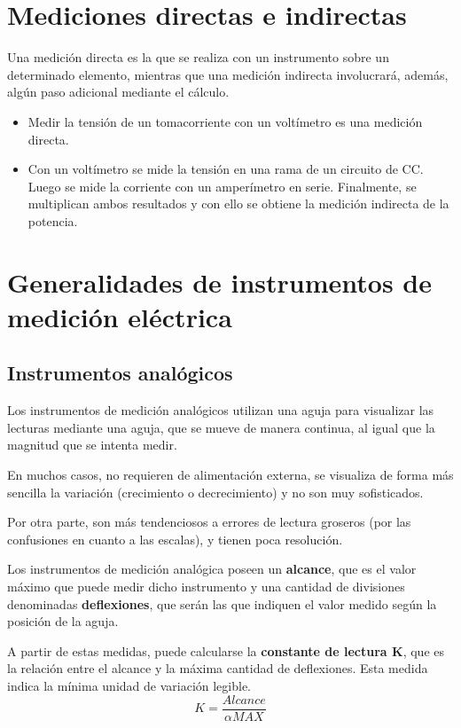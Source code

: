 \section{Mediciones directas e indirectas}

Una medición directa es la que se realiza con un instrumento sobre un determinado elemento, mientras que una medición indirecta involucrará, además, algún paso adicional mediante el cálculo.
\begin{ejemplo}
	
	\begin{itemize}
		\item Medir la tensión de un tomacorriente con un voltímetro es una medición directa.
		\item Con un voltímetro se mide la tensión en una rama de un circuito de CC. Luego se mide la corriente con un amperímetro en serie. Finalmente, se multiplican ambos resultados y con ello se obtiene la medición indirecta de la potencia.
	\end{itemize}		
\section{Generalidades de instrumentos de medición eléctrica}

\subsection{Instrumentos analógicos}

Los instrumentos de medición analógicos utilizan una aguja para visualizar las lecturas mediante una aguja, que se mueve de manera continua, al igual que la magnitud que se intenta medir.

En muchos casos, no requieren de alimentación externa, se visualiza de forma más sencilla la variación (crecimiento o decrecimiento) y no son muy sofisticados. 

Por otra parte, son más tendenciosos a errores de lectura groseros (por las confusiones en cuanto a las escalas), y tienen poca resolución.

Los instrumentos de medición analógica poseen un \textbf{alcance}, que es el valor máximo que puede medir dicho instrumento y una cantidad de divisiones denominadas \textbf{deflexiones}, que serán las que indiquen el valor medido según la posición de la aguja.

A partir de estas medidas, puede calcularse la \textbf{constante de lectura K}, que es la relación entre el alcance y la máxima cantidad de deflexiones. Esta medida indica la mínima unidad de variación legible.
$$ K = \frac{Alcance}{\alpha MAX} $$


\end{ejemplo}
